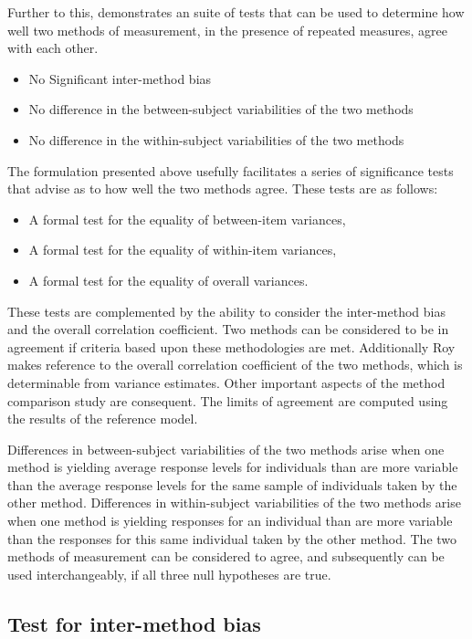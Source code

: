 \documentclass[12pt, a4paper]{report}
\theoremstyle{plain}
\theoremstyle{definition}
\theoremstyle{remark}
\begin{document}
	Further to this, \citet{ARoy2009} demonstrates an suite of tests that can be used to determine how well two methods of measurement, in the presence of repeated measures, agree with each other.
	
	\begin{itemize}\itemsep0.5cm
		\item No Significant inter-method bias
		\item No difference in the between-subject variabilities of the two methods
		\item No difference in the within-subject variabilities of the two methods
	\end{itemize}
	
	The formulation presented above usefully facilitates a series of
	significance tests that advise as to how well the two methods
	agree. These tests are as follows:
	\begin{itemize}
		\item A formal test for the equality of between-item variances,
		\item A formal test for the equality of within-item variances,
		\item A formal test for the equality of overall variances.
	\end{itemize}
	These tests are complemented by the ability to consider the inter-method bias and the overall correlation coefficient. Two methods can be considered to be in agreement if criteria based upon these methodologies are met. Additionally Roy makes reference to the overall correlation coefficient of the two methods, which is determinable from variance estimates. Other important aspects of the method comparison study are consequent. The limits of agreement are computed using the results of the reference model.
	
	Differences in between-subject variabilities of the two methods arise when one method is yielding average response levels for individuals than are more variable than the average response levels for the same sample of individuals taken by the other method.  Differences in within-subject variabilities of the two methods arise when one method is yielding responses for an individual than are more variable than the responses for this same individual taken by the other method. The two methods of measurement can be considered to agree, and subsequently can be used interchangeably, if all three null hypotheses are true.	
	
	
	
	\subsection{Test for inter-method bias}
	
\end{document}
